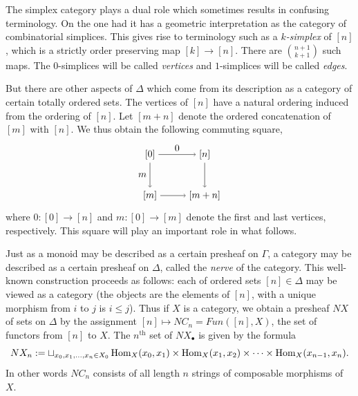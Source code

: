 \documentclass{amsart}
\begin{document}
The simplex category plays a dual role which sometimes results in confusing terminology. On the one had it has a geometric interpretation as the category of combinatorial simplices. This gives rise to terminology such as a {\em $k$-simplex} of $[n]$, which is a strictly order preserving map $[k] \to [n]$. There are $ {n+1}\choose {k+1}$ such maps. The $0$-simplices will be called {\em vertices} and $1$-simplices will be called {\em edges}. 

But there are other aspects of $\Delta$ which come from its description as a category of certain totally ordered sets. The vertices of $[n]$ have a natural ordering induced from the ordering of $[n]$. Let $[m + n]$ denote the ordered concatenation of $[m]$ with $[n]$. We thus obtain the following commuting square,
\begin{equation} \label{Eqn:Segal-Co-Map}
\begin{tikzpicture}[baseline = 0.75cm]
	\node (LT) at (0, 1.5) {$[0]$};
	\node (LB) at (0, 0) {$[m]$};
	\node (RT) at (2, 1.5) {$[n]$};
	\node (RB) at (2, 0) {$[m+n]$};
	\draw [->] (LT) -- node [left] {$m$} (LB);
	\draw [->] (LT) -- node [above] {$0$} (RT);
	\draw [->] (RT) -- node [right] {$$} (RB);
	\draw [->] (LB) -- node [below] {$$} (RB);
\end{tikzpicture}
\end{equation}
where $0: [0] \to [n]$ and $m: [0] \to [m]$ denote the first and last vertices, respectively. This square will play an important role in what follows. 

Just as a monoid may be described as a certain presheaf on $\Gamma$, a category may be described as a certain presheaf on $\Delta$, called the {\em nerve} of the category. This well-known construction proceeds as follows: each of ordered sets $[n] \in \Delta$ may be viewed as a category (the objects are the elements of $[n]$, with a unique morphism from $i$ to $j$ is $i \leq j$). Thus if $X$ is a category, we obtain a presheaf $NX$ of sets on $\Delta$ by the assignment $[n] \mapsto NC_n = Fun([n], X)$, the set of functors from $[n]$ to $X$.    
The $n^\textrm{th}$ set of $NX_{\bullet}$ is given by the formula
\begin{equation*}
	NX_n := \sqcup_{x_0, x_1, \dots, x_n \in X_0} \operatorname{Hom}_X(x_0, x_1) \times \operatorname{Hom}_X(x_1, x_2) \times \cdots \times \operatorname{Hom}_X(x_{n-1}, x_n).
\end{equation*}
In other words $NC_n$ consists of all length $n$ strings of composable morphisms of $X$.
\end{document}
